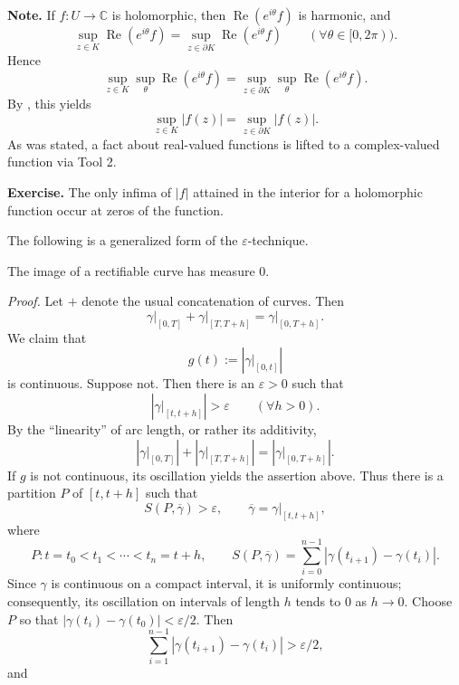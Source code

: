 \documentclass[11pt,a4paper]{article}
\begin{document}
\textbf{Note.}
If $f\colon U\to\mathbb C$ is holomorphic, then \(\operatorname{Re}(e^{i\theta}f)\)
is harmonic, and
\[
\sup_{z\in K}\operatorname{Re}(e^{i\theta}f)
=\sup_{z\in\partial K}\operatorname{Re}(e^{i\theta}f)
\qquad(\forall\theta\in[0,2\pi)).
\]
Hence
\[
\sup_{z\in K}\sup_\theta\operatorname{Re}(e^{i\theta}f)
=\sup_{z\in\partial K}\sup_\theta\operatorname{Re}(e^{i\theta}f).
\]
By , this yields
\[
\sup_{z\in K}|f(z)|=\sup_{z\in\partial K}|f(z)|.
\]
As was stated, a fact about real-valued functions is lifted to a complex-valued function via Tool 2.

\textbf{Exercise.}
The only infima of $|f|$ attained in the interior for a holomorphic function occur at zeros of the function.


The following is a generalized form of the $\varepsilon$-technique.

The image of a rectifiable curve has measure $0$.

\textit{Proof.}
Let $+$ denote the usual concatenation of curves. Then
\[
\gamma\big|_{[0,T]}+\gamma\big|_{[T,T+h]}
=\gamma\big|_{[0,T+h]}.
\]
We claim that
\[
g(t):=\left|\gamma\big|_{[0,t]}\right|
\]
is continuous. Suppose not. Then there is an $\varepsilon>0$ such that
\[
\left|\gamma\big|_{[t,t+h]}\right|>\varepsilon
\qquad(\forall h>0).
\]
By the ``linearity'' of arc length, or rather its additivity,
\[
\left|\gamma\big|_{[0,T]}\right|
+\left|\gamma\big|_{[T,T+h]}\right|
=\left|\gamma\big|_{[0,T+h]}\right|.
\]
If $g$ is not continuous, its oscillation yields the assertion above. Thus there is a partition $P$ of $[t,t+h]$ such that
\[
S(P,\overline\gamma)>\varepsilon,
\qquad
\overline\gamma=\gamma\big|_{[t,t+h]},
\]
where
\[
P:t=t_0<t_1<\cdots<t_n=t+h,
\qquad
S(P,\overline\gamma)=\sum_{i=0}^{n-1}
|\gamma(t_{i+1})-\gamma(t_i)|.
\]
Since $\gamma$ is continuous on a compact interval, it is uniformly continuous; consequently, its oscillation on intervals of length $h$ tends to $0$ as $h\to0$. Choose $P$ so that \(|\gamma(t_i)-\gamma(t_0)|<\varepsilon/2.\)
Then
\[
\sum_{i=1}^{n-1}|\gamma(t_{i+1})-\gamma(t_i)|>\varepsilon/2,
\]
and

\end{document}
